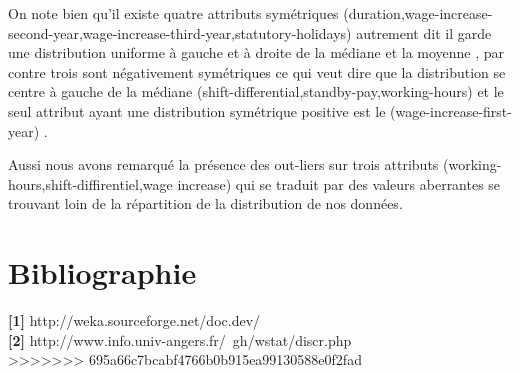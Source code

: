 \documentclass[12pt,a4paper,oneside]{book}
\begin{document}
On note bien qu'il existe quatre attributs symétriques (duration,wage-increase-second-year,wage-increase-third-year,statutory-holidays) autrement dit il garde une distribution uniforme à gauche et à droite de la médiane et la moyenne , par contre trois sont  négativement symétriques ce qui veut dire que la distribution se centre à gauche de la médiane (shift-differential,standby-pay,working-hours) et le seul attribut ayant une distribution symétrique positive est le (wage-increase-first-year) .

Aussi nous avons remarqué la présence des out-liers sur trois attributs (working-hours,shift-diffirentiel,wage increase) qui se traduit par des valeurs aberrantes se trouvant loin de la répartition de la distribution de nos données.



\chapter*{Bibliographie}

\textbf{[1]} http://weka.sourceforge.net/doc.dev/\\
\textbf{[2]} http://www.info.univ-angers.fr/~gh/wstat/discr.php\\
>>>>>>> 695a66c7bcabf4766b0b915ea99130588e0f2fad
\end{document}
